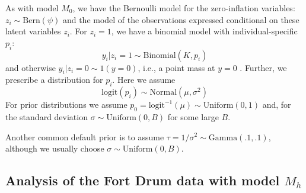 As with model $M_{0}$, we have the Bernoulli model for the
zero-inflation variables: $z_{i} \sim \mbox{Bern}(\psi)$ and the model
of the observations expressed conditional on these latent variables
$z_{i}$. For $z_{i}=1$, we have a binomial model with
individual-specific $p_{i}$:
\[
y_{i}|{z_{i} \! = \! 1} \sim \mbox{Binomial}(K,p_{i})
\]
and otherwise $y_{i} |{ z_{i} \! = \! 0} \sim 1(y=0)$, i.e., a point
mass at $y=0$ . Further, we
prescribe a distribution for $p_{i}$. Here we assume
\[
\mathrm{logit}(p_{i}) \sim \mbox{Normal}(\mu,\sigma^2)
\]
For prior distributions we assume
$p_{0} = \mbox{logit}^{-1}(\mu) \sim
\mbox{Uniform}(0,1)$ and, for the standard deviation
$\sigma \sim \mbox{Uniform}(0,B)$ for some large $B$.

Another common default prior is to assume
$\tau = 1/\sigma^{2} \sim \mbox{Gamma}(.1,.1)$, although we usually
choose  $\sigma \sim \mbox{Uniform}(0,B)$.



\subsection{Analysis of the Fort Drum data with model $M_{h}$}
\label{closed.sec.Mhbear}

